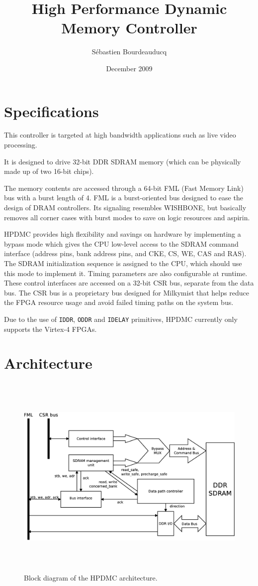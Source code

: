 \documentclass[a4paper,11pt]{article}
\title{High Performance Dynamic Memory Controller}
\author{S\'ebastien Bourdeauducq}
\date{December 2009}
\begin{document}
\setlength{\parindent}{0pt}
\setlength{\parskip}{5pt}
\maketitle{}
\section{Specifications}
This controller is targeted at high bandwidth applications such as live video processing.

It is designed to drive 32-bit DDR SDRAM memory (which can be physically made up of two 16-bit chips).

The memory contents are accessed through a 64-bit FML (Fast Memory Link) bus with a burst length of 4. FML is a burst-oriented bus designed to ease the design of DRAM controllers. Its signaling resembles WISHBONE, but basically removes all corner cases with burst modes to save on logic resources and aspirin.

HPDMC provides high flexibility and savings on hardware by implementing a bypass mode which gives the CPU low-level access to the SDRAM command interface (address pins, bank address pins, and CKE, CS, WE, CAS and RAS). The SDRAM initialization sequence is assigned to the CPU, which should use this mode to implement it. Timing parameters are also configurable at runtime. These control interfaces are accessed on a 32-bit CSR bus, separate from the data bus. The CSR bus is a proprietary bus designed for Milkymist that helps reduce the FPGA resource usage and avoid failed timing paths on the system bus.

Due to the use of \verb!IDDR!, \verb!ODDR! and \verb!IDELAY! primitives, HPDMC currently only supports the Virtex-4 FPGAs.

\section{Architecture}

\begin{figure}[H]
\centering
\includegraphics[height=100mm]{blockdiagram.eps}
\caption{Block diagram of the HPDMC architecture.}\label{fig:blockdiagram}
\end{figure}
\end{document}
